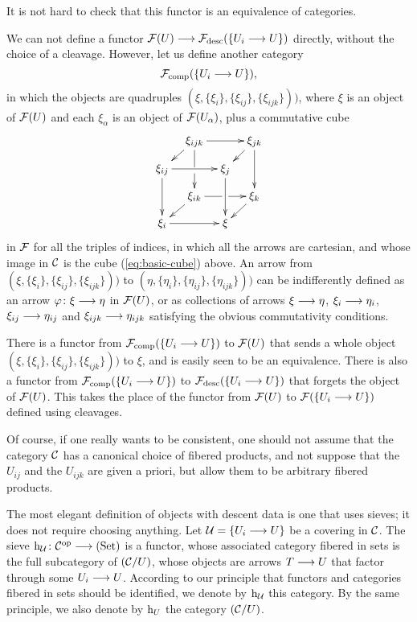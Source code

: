 \begin{4   STACKS}
\begin{4.1 Descent of objects of fibcats}
It is not hard to check that this functor is an equivalence of categories.

We can not define a functor $\cF(U) \arr \cF\desc (\{U_i \to U\})$ directly, without the choice of a cleavage. However, let us define another category
   \[
   \mathcal{F}_{\mathrm{comp}} (\{U_i \longrightarrow U\}),
   \]
in which the objects are quadruples $(\xi, \{\xi_i\}, \{\xi_{ij}\}, \{\xi_{ijk}\}))$, where $\xi$ is an object of $\mathcal{F}(U)$ and each $\xi_\alpha$ is an object of $\mathcal{F}(U_{\alpha})$, plus a commutative cube
   \[
   \xymatrix@-15pt{
   &\xi_{ijk}\ar[rr]\ar'[d][dd]
   \ar[ld]
   &&\xi_{jk}\ar[ld]\ar[dd]\\
   \xi_{ij}\ar[dd]\ar[rr]
   && \xi_j\ar[dd]\\
   &\xi_{ik} \ar[ld]\ar'[r][rr]
   &&\xi_k\ar[ld]\\
   \xi_i\ar[rr]&&\xi
   }
   \]
in $\mathcal{F}$ for all the triples of indices, in which all the arrows are cartesian, and whose image in $\mathcal{C}$ is the cube (\ref{eq:basic-cube}) above. An arrow from $(\xi, \{\xi_i\}, \{\xi_{ij}\}, \{\xi_{ijk}\}))$ to $(\eta, \{\eta_i\}, \{\eta_{ij}\}, \{\eta_{ijk}\}))$ can be indifferently defined as an arrow $\phi \colon \xi \arr \eta$ in $\mathcal{F}(U)$, or as collections of arrows $\xi \arr \eta$, $\xi_i \arr \eta_i$, $\xi_{ij} \arr \eta _{ij}$ and $\xi_{ijk} \arr \eta_{ijk}$ satisfying the obvious commutativity conditions.

There is a functor from $\mathcal{F}_{\mathrm{comp}} (\{U_i \longrightarrow U\})$ to $\mathcal{F}(U)$ that sends a whole object $(\xi, \{\xi_i\}, \{\xi_{ij}\}, \{\xi_{ijk}\}))$ to $\xi$, and is easily seen to be an equivalence. There is also a functor from $\mathcal{F}_{\mathrm{comp}} (\{U_i \longrightarrow U\})$ to $\mathcal{F}_{\mathrm{desc}} (\{U_i \longrightarrow U\})$ that forgets the object of $\mathcal{F}(U)$. This takes the place of the functor from $\mathcal{F}(U)$ to $\mathcal{F}(\{U_i \longrightarrow U\})$ defined using cleavages.

\begin{remark}
Of course, if one really wants to be consistent, one should not assume that the category $\mathcal{C}$ has a canonical choice of fibered products, and not suppose that the $U_{ij}$ and the $U_{ijk}$ are given a priori, but allow them to be arbitrary fibered products.
\end{remark}

The most elegant definition of objects with descent data is one that uses sieves; it does not require choosing anything. Let $\mathcal{U} = \{U_i \longrightarrow U\}$ be a covering in $\mathcal{C}$. The sieve  $\h_{\cU} \colon \cC\op \arr \catset$ is a functor, whose associated category fibered in sets is the full subcategory of $(\mathcal{C}/U)$, whose objects are arrows $T \arr U$ that factor through some $U_i \arr U$. According to our principle that functors and categories fibered in sets should be identified, we denote by $\mathrm{h}_{\mathcal{U}}$ this category. By the same principle, we also denote by $\mathrm{h}_{U}$ the category $(\mathcal{C}/U)$.


\end{4.1 Descent of objects of fibcats}
\end{4   STACKS}
